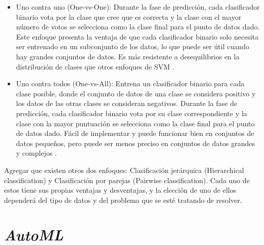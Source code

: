 \begin{itemize}
	\item Uno contra uno (One-vs-One): Durante la fase de predicción, cada clasificador binario vota por la clase que cree que es correcta y la clase con el mayor número de votos se selecciona como la clase final para el punto de datos dado. Este enfoque presenta la ventaja de que cada clasificador binario solo necesita ser entrenado en un subconjunto de los datos, lo que puede ser útil cuando hay grandes conjuntos de datos. Es más resistente a desequilibrios en la distribución de clases que otros enfoques de SVM \citep{guenther2016support}.
	\item Uno contra todos (One-vs-All): Entrena un clasificador binario para cada clase posible, donde el conjunto de datos de una clase se considera positivo y los datos de las otras clases se consideran negativos. Durante la fase de predicción, cada clasificador binario vota por su clase correspondiente y la clase con la mayor puntuación se selecciona como la clase final para el punto de datos dado. Fácil de implementar y puede funcionar bien en conjuntos de datos pequeños, pero puede ser menos preciso en conjuntos de datos grandes y complejos \citep{guenther2016support}.
\end{itemize}
Agregar que existen otros dos enfoques: Clasificación jerárquica (Hierarchical classification) y Clasificación por parejas (Pairwise classification). Cada uno de estos tiene sus propias ventajas y desventajas, y la elección de uno de ellos dependerá del tipo de datos y del problema que se esté tratando de resolver.

         
\section{\textit{AutoML}}


